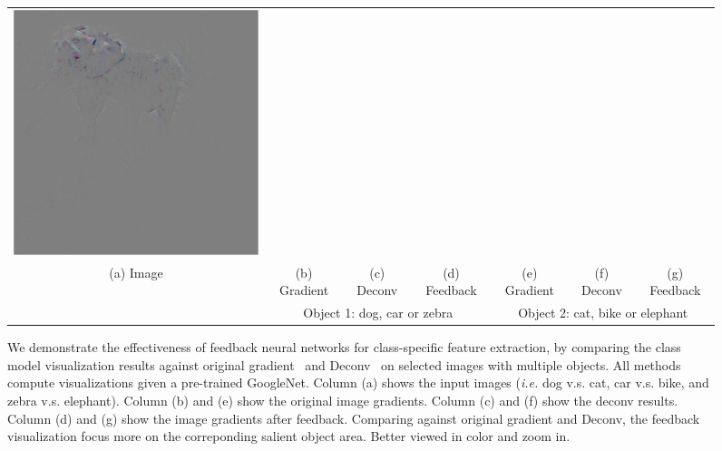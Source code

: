 \begin{figure}
\begin{center}
\begin{tabular}{ccccccc}
\includegraphics[width=0.14\linewidth,height=0.115\linewidth]{figs/examples/googlenet/soft/zeb-ele2_diff_387} \\
{\small (a) Image} &
{\small (b) Gradient} &
{\small (c) Deconv} &
{\small (d) Feedback} &
{\small (e) Gradient} &
{\small (f) Deconv} &
{\small (g) Feedback} \\
& \multicolumn{3}{c}{\small Object 1: dog, car or zebra} & \multicolumn{3}{c}{\small Object 2: cat, bike or elephant} \\
\end{tabular}
\caption{We demonstrate the effectiveness of feedback neural networks for class-specific feature extraction, by comparing the class model visualization results against original gradient~\cite{simonyan2013deep} and Deconv~\cite{zeiler2014visualizing} on selected images with multiple objects. All methods compute visualizations given a pre-trained GoogleNet. Column (a) shows the input images (\emph{i.e.} dog v.s. cat, car v.s. bike, and zebra v.s. elephant). Column (b) and (e) show the original image gradients. Column (c) and (f) show the deconv results. Column (d) and (g) show the image gradients after feedback. Comparing against original gradient and Deconv, the feedback visualization focus more on the correponding salient object area. Better viewed in color and zoom in.} 
\label{fig:examples}
\end{center}
\end{figure}

